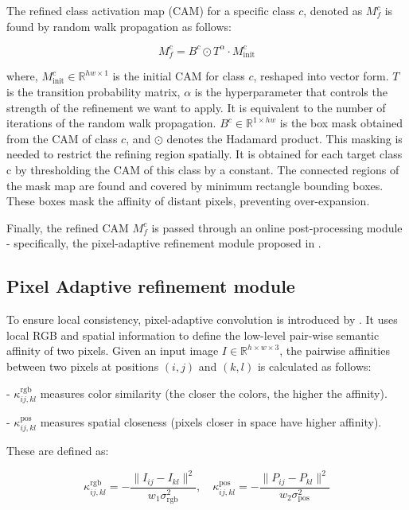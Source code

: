 The refined class activation map (CAM) for a specific class $c$, denoted as $M^c_f$ is found by random walk propagation as follows:

\begin{equation}
    M_f^c = B^c \odot T^\alpha \cdot M_{\text{init}}^c
\end{equation}

where, $M^c_{\text{init}} \in \mathbb{R}^{hw \times 1}$ is the initial CAM for class $c$, reshaped into vector form. $T$ is the transition probability matrix, $\alpha$ is the hyperparameter that controls the strength of the refinement we want to apply. It is equivalent to the number of iterations of the random walk propagation. \( B^c \in \mathbb{R}^{1 \times hw} \) is the box mask obtained from the CAM of class \( c \), and \( \odot \) denotes the Hadamard product. This masking is needed to restrict the refining region spatially. It is obtained for each target class c by thresholding the CAM of this class by a constant. The connected regions of the mask map are found and covered by minimum rectangle bounding boxes. These boxes mask the affinity of distant pixels, preventing over-expansion.

Finally, the refined CAM $M^c_f$ is passed through an online post-processing module - specifically, the pixel-adaptive refinement module proposed in \cite{wsss_afa_affinity_from_attention}.

\subsection{Pixel Adaptive refinement module}
\label{subsec:par}
To ensure local consistency, pixel-adaptive convolution is introduced by \cite{wsss_afa_affinity_from_attention}. It uses local RGB and spatial information to define the low-level pair-wise semantic affinity of two pixels. Given an input image \( I \in \mathbb{R}^{h \times w \times 3} \), the pairwise affinities between two pixels at positions \((i, j)\) and \((k, l)\) is calculated as follows:

- \( \kappa^{\text{rgb}}_{ij,kl} \) measures color similarity (the closer the colors, the higher the affinity).

- \( \kappa^{\text{pos}}_{ij,kl} \) measures spatial closeness (pixels closer in space have higher affinity).

These are defined as:

\[
    \kappa^{\text{rgb}}_{ij,kl} = -\frac{\| I_{ij} - I_{kl} \|^2}{w_1 \sigma^2_{\text{rgb}}}, \quad
    \kappa^{\text{pos}}_{ij,kl} = -\frac{\| P_{ij} - P_{kl} \|^2}{w_2 \sigma^2_{\text{pos}}}
\]

